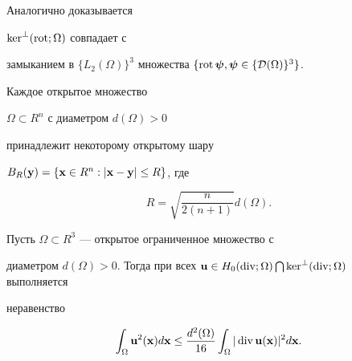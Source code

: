 Аналогично доказывается





\begin{lems}\label{ro}


$\ker^{\bot}(\operatorname{rot};\Omega)$ совпадает с


замыканием в $\{L_2(\Omega)\}^3$ множества $\{


\Rot\boldsymbol{\psi},\boldsymbol{\psi}\in\{{\cal D}(\Omega)\}^3\}$.


\end{lems}





\begin{thms}


Каждое открытое множество


${\Omega\subset R^n}$ с диаметром $d(\Omega){>}0$


принадлежит некоторому открытому шару


${B_R(\bold{y})=\{\bold{x}\in


R^n:|\bold{x}-\bold{y}|\leq R\}}$, где


\begin{equation}


R=\sqrt{\frac{n}{2(n+1)}}d(\Omega). \label{un}


\end{equation}


\end{thms}





\begin{thms}


Пусть $\Omega\subset R^3$ --- открытое ограниченное множество с


диаметром $d(\Omega)>0$. Тогда при всех $\bold{u}\in


H_0(\Div;\Omega)\bigcap \ker^{\bot}(\Div;\Omega)$ выполняется


неравенство


$$


\int_{\Omega}\bold{u}^2(\bold{x})d\bold{x}\leq\frac{d^2(\Omega)}{16}


\int_{\Omega}|\Div\bold{u}(\bold{x})|^2d\bold{x}.


$$


\end{thms}





